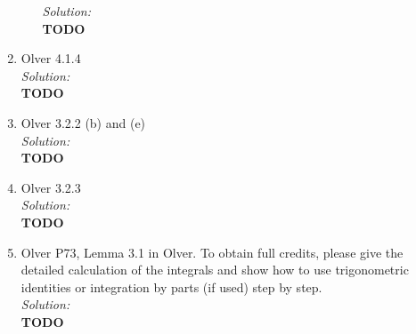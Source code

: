 \documentclass[10pt]{amsart}
\theoremstyle{nonumberplain}
\begin{document}
\begin{enumerate}[label={\bf {\arabic*}:}]
\begin{enumerate}
\noindent
\textit{Solution:} \\
\textbf{TODO} \\

\end{enumerate}

\newpage

\item Olver 4.1.4 \\

\noindent
\textit{Solution:} \\
\textbf{TODO} \\

\newpage

\item Olver 3.2.2 (b) and (e) \\

\noindent
\textit{Solution:} \\
\textbf{TODO} \\

\newpage

\item Olver 3.2.3 \\

\noindent
\textit{Solution:} \\
\textbf{TODO} \\

\newpage

\item Olver P73, Lemma 3.1 in Olver.
To obtain full credits, please give the detailed calculation of the integrals and show how to use trigonometric identities or integration by parts (if used) step by step. \\

\noindent
\textit{Solution:} \\
\textbf{TODO} \\

\end{enumerate}
\end{document}
